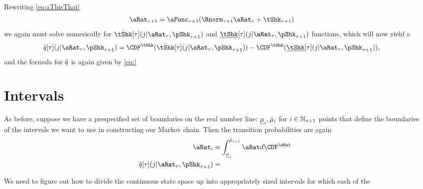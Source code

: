 \documentclass[../BufferStockTheory.tex]{subfiles}\usepackage{ApndxSteadyState}
\begin{document}
  Rewriting \eqref{eq:aThisThat}
  \begin{align}
    \point_{\tAbs+1} & = \aFunc_{\tAbs+1}(\Rnorm_{\tAbs+1} \point_{\tAbs} + \tShk_{\tAbs+1})
  \end{align}
  we again must solve numerically for $\Top{\tShk}[\tAbs](\that|\point_{\tAbs},\pShk_{\tAbs+1})$ and $\Bot{\tShk}[\tAbs](\that|\point_{\tAbs},\pShk_{\tAbs+1})$ functions, which will now yield a
  \begin{align}
    \Nxt{\pDistDscr}[\tAbs](\that|\point_{\tAbs},\pShk_{\tAbs+1}) & = \CDF^{\tShk}(\Top{\tShk}[\tAbs](\that|\point_{\tAbs},\pShk_{\tAbs+1}))-\CDF^{\tShk}(\Bot{\tShk}[\tAbs](\that|\point_{\tAbs},\pShk_{\tAbs+1})),
  \end{align}
  and the formula for $\grave{q}$ is again given by \eqref{eq:}

  \begin{comment} %
    We now have the {\pmf} of $\SetSub_{\that}$ for any fixed $\point_{\tAbs}$, so all we need to do is integrate over all possible values of $\point_{\tAbs} \in \SetSub_{\this}$:
    \begin{align}
      \PTrns_{\this,\that}[\tAbs] &= \int_{\Bot{\SetSub}_{\this}}^{\Top{\SetSub}_{\this}} \Nxt{\pDistDscr}[\tAbs](\that|\point_{\tAbs}) d\CDF^{\pShk}_{\tAbs}.
    \end{align}
  \end{comment}


  \section{Intervals}

  As before, suppose we have a prespecified set of boundaries on the real number line: $\underline{\mu}_{i},\bar{\mu}_{i}$ for $i \in \mathbb{N}_{n+1}$ points that define the boundaries of the intervals we want to use in constructing our Markov chain.  Then the transition probabilities are again
  \begin{align}
    \point_{\this} & \equiv \int_{\Bot{\SetSub}_{\this}}^{\Top{\SetSub}_{\this+1}} \point d\CDF^{\point}
    \\ \Nxt{\pDistDscr}[\tAbs](\that|\point_{\tAbs},\pShk_{\tAbs+1}) &= 
  \end{align}



  We need to figure out how to divide the continuous state space up into appropriately sized intervals for which each of the
\end{document}
